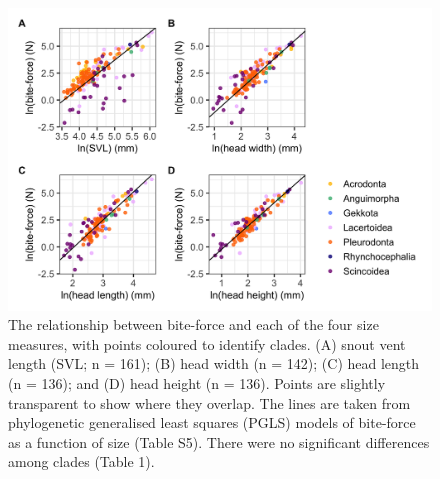 \documentclass[a4paper, 12pt]{article}
\begin{document}
\newpage
\begin{figure}[h]
 \centering
  \includegraphics[width = \linewidth]{figures/bodysize-bite-force-coloured.png}
  \caption{The relationship between bite-force and each of the four size measures, with points coloured to identify clades. 
  (A) snout vent length (SVL; n = 161); (B) head width (n = 142); (C) head length (n = 136); and (D) head height (n = 136). 
  Points are slightly transparent to show where they overlap. 
  The lines are taken from phylogenetic generalised least squares (PGLS) models of bite-force as a function of size (Table S5). 
  There were no significant differences among clades (Table 1). 
  }
  \label{fig-size-biteforce}
\end{figure}
\end{document}

